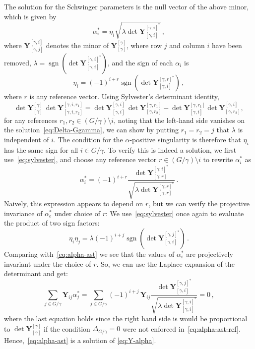 \documentclass[12pt]{article}
\numberwithin{figure}{section}
\DeclareMathOperator{\sgn}{sgn}
\def \be {\begin{equation}}
\def \ee {\end{equation}}
\def \Y {\mathbf{Y}}
\begin{document}
                The solution for the Schwinger parameters is the null vector of the above minor, which is given by
		        \be\label{eq:alpha-ast}
		        \alpha_i^\ast = \eta_i \sqrt{ \lambda \det \Y_{[\gamma,i]}^{[\gamma,i]^\ast}} \,,
		        \ee
		      where $\Y_{[\gamma,j]}^{[\gamma,i]}$ denotes the minor of $\Y_{[\gamma]}^{[\gamma]}$, where row $j$ and column $i$ have been removed, $\lambda = \sgn \left( \det \Y_{[\gamma,i]}^{[\gamma,i]^\ast} \right)$, and the sign of each $\alpha_i$ is
		      \be
		      \eta_i = (-1)^{i+r} \sgn \left( \det \Y_{[\gamma,i]}^{[\gamma,r]^\ast} \right) \,,
		      \ee 
		      where $r$ is any reference vector. Using Sylvester's determinant identity,
		        \be
		        \label{eq:sylvester}
		            \det \Y_{[\gamma]}^{[\gamma]} \, \det \Y_{[\gamma,i,r_2]}^{[\gamma,i,r_1]} = \det \Y_{[\gamma,i]}^{[\gamma,i]} \, \det \Y_{[\gamma,r_2]}^{[\gamma,r_1]} - \det \Y_{[\gamma,i]}^{[\gamma,r_1]} \det \Y_{[\gamma,r_2]}^{[\gamma,i]} ,
		        \ee
		        for any references $r_1,r_2 \in (G/\gamma){\setminus} i$, noting that the left-hand side vanishes on the solution~\eqref{eq:Delta-Ggamma}, we can show by putting $r_1=r_2=j$ that $\lambda$ is independent of $i$.  
		        The condition for the $\alpha$-positive singularity is therefore that $\eta_i$ has the same sign for all $i \in G/\gamma$. 
		        To verify this is indeed a solution, we first use~\eqref{eq:sylvester}, and choose any reference vector $r\in (G/\gamma){\setminus} i$ to rewrite $\alpha_i^\ast$ as
		        \be
		        \label{eq:alpha-ast-ref}
		            \alpha_i^\ast
		            =
		            (-1)^{i+r}
		            \frac{\det \Y_{[\gamma,r]}^{[\gamma,i]^\ast}}{\sqrt{ \lambda \det \Y_{[\gamma,r]}^{[\gamma,r]^\ast}}} \,.
		        \ee
		       Naively, this expression appears to depend on $r$, but we can verify the projective invariance of $\alpha_e^\ast$ under choice of $r$: We use~\eqref{eq:sylvester} once again to evaluate the product of two sign factors:
		      \be 
		        \eta_i \eta_j = \lambda (-1)^{i+j} \sgn \left( \det \Y_{[\gamma,i]}^{[\gamma,j]^\ast} \right) \,.
		        \label{eq:etaprod}
		      \ee 
		      Comparing with~\eqref{eq:alpha-ast} we see that
		      the values of $\alpha_i^\ast$ are projectively invariant under the choice of $r$. So, we can use the Laplace expansion of the determinant and get:
		        \be
		        \sum_{j \in G/\gamma} \Y_{ij} \alpha_j^\ast =
		        \sum_{j \in G/\gamma} (-1)^{i+j}\, \Y_{ij} \frac{\det \Y^{[\gamma,j]^\ast}_{[\gamma,i]}}{\sqrt{\lambda \det \Y_{[\gamma,i]}^{[\gamma,i]^\ast}}}
		        =
		        0 \,,
		        \ee
		        where the last equation holds since
		        the right hand side is would be proportional to  $\det \Y^{[\gamma]}_{[\gamma]}$ if the condition $\Delta_{G/\gamma} = 0$ were not enforced in~\eqref{eq:alpha-ast-ref}.
		        Hence,~\eqref{eq:alpha-ast} is a solution of \eqref{eq:Y-alpha}.
		        
\end{document}
